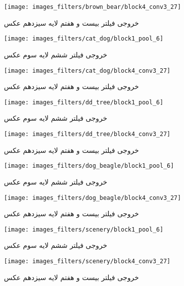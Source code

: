 \documentclass{article}
\begin{document}
\begin{figure}[H]
	\centerline{\texttt{[image: images\_filters/brown\_bear/block4\_conv3\_27]}}
	\caption{خروجی فیلتر بیست و هفتم لایه سیزدهم عکس }
\end{figure}

\begin{figure}[H]
	\centerline{\texttt{[image: images\_filters/cat\_dog/block1\_pool\_6]}}
	\caption{خروجی فیلتر ششم لایه سوم عکس }
\end{figure}

\begin{figure}[H]
	\centerline{\texttt{[image: images\_filters/cat\_dog/block4\_conv3\_27]}}
	\caption{خروجی فیلتر بیست و هفتم لایه سیزدهم عکس }
\end{figure}

\begin{figure}[H]
	\centerline{\texttt{[image: images\_filters/dd\_tree/block1\_pool\_6]}}
	\caption{خروجی فیلتر ششم لایه سوم عکس }
\end{figure}

\begin{figure}[H]
	\centerline{\texttt{[image: images\_filters/dd\_tree/block4\_conv3\_27]}}
	\caption{خروجی فیلتر بیست و هفتم لایه سیزدهم عکس }
\end{figure}

\begin{figure}[H]
	\centerline{\texttt{[image: images\_filters/dog\_beagle/block1\_pool\_6]}}
	\caption{خروجی فیلتر ششم لایه سوم عکس }
\end{figure}

\begin{figure}[H]
	\centerline{\texttt{[image: images\_filters/dog\_beagle/block4\_conv3\_27]}}
	\caption{خروجی فیلتر بیست و هفتم لایه سیزدهم عکس }
\end{figure}

\begin{figure}[H]
	\centerline{\texttt{[image: images\_filters/scenery/block1\_pool\_6]}}
	\caption{خروجی فیلتر ششم لایه سوم عکس }
\end{figure}

\begin{figure}[H]
	\centerline{\texttt{[image: images\_filters/scenery/block4\_conv3\_27]}}
	\caption{خروجی فیلتر بیست و هفتم لایه سیزدهم عکس }
\end{figure}
\end{document}
